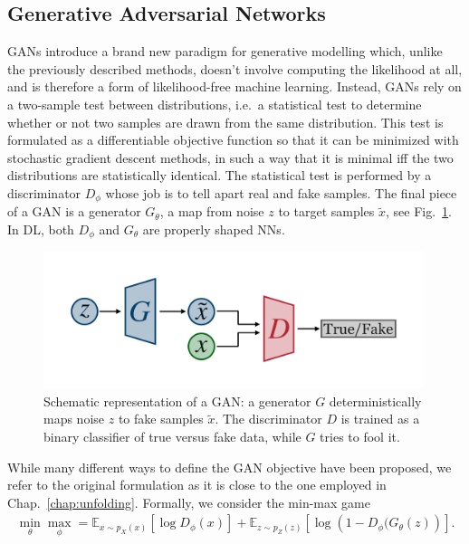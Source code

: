 \subsection{Generative Adversarial Networks}\label{intro:gan}
GANs introduce a brand new paradigm for generative modelling which, unlike the previously described methods, doesn't involve computing the likelihood at all, and is therefore a form of likelihood-free machine learning. Instead, GANs rely on a two-sample test between distributions, i.e.\ a statistical test to determine whether or not two samples are drawn from the same distribution. This test is formulated as a differentiable objective function so that it can be minimized with stochastic gradient descent methods, in such a way that it is minimal iff the two distributions are statistically identical.
The statistical test is performed by a discriminator $D_{\phi}$ whose job is to tell apart real and fake samples. The final piece of a GAN is a generator $G_{\theta}$, a map from noise $z$ to target samples $\tilde{x}$, see Fig.~\ref{fig:gan}. In DL, both $D_{\phi}$ and $G_{\theta}$ are properly shaped NNs.
%
\begin{figure}[t]
\centering
\includegraphics[page = 1, width=0.99\textwidth]{./figures/gan}
\caption{Schematic representation of a GAN: a generator $G$ deterministically maps noise $z$ to fake samples $\tilde{x}$. The discriminator $D$ is trained as a binary classifier of true versus fake data, while $G$ tries to fool it.}
\label{fig:gan}
\end{figure}
%
While many different ways to define the GAN objective have been proposed, we refer to the original formulation\cite{goodfellow} as it is close to the one employed in Chap.~\ref{chap:unfolding}. Formally, we consider the min-max game 
%
\begin{align}
\min_{\theta} \max_{\phi} = \mathbb{E}_{x \sim p_{X}(x)} \left[ \log D_{\phi} (x) \right] + \mathbb{E}_{z\sim p_{Z}(z)} \left[ \log \left( 1 - D_{\phi} (G_{\theta}(z) \right) \right].
\end{align}
